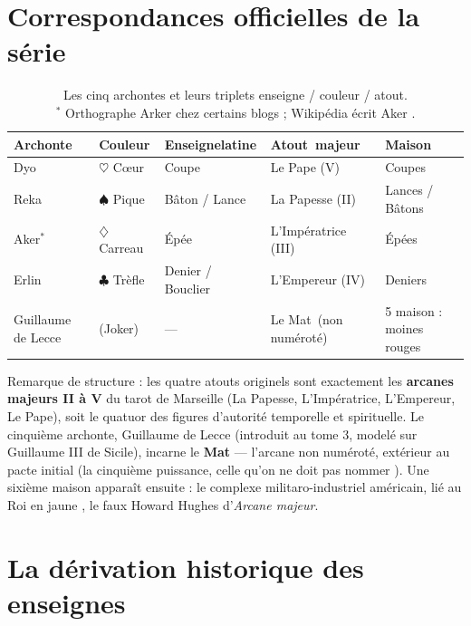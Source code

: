 \documentclass[11pt,a5paper]{article}
\newcommand{\carreau}{\ensuremath{\diamondsuit}}
\newcommand{\coeur}{\ensuremath{\heartsuit}}
\newcommand{\pique}{\ensuremath{\spadesuit}}
\newcommand{\trefle}{\ensuremath{\clubsuit}}
\begin{document}
\section{Correspondances officielles de la série}

\begin{table}[h]
\centering
\begin{tabular}{ p{} p{} p{} p{} p{}}
\toprule
\textbf{Archonte} 	& \textbf{Couleur} 		& \textbf{Enseigne\newline latine} & \textbf{Atout~\newline majeur} & \textbf{Maison} \\
\midrule
Dyo 				& \coeur{} Cœur 		& Coupe 				& Le Pape (V) 			& Coupes \\
Reka 				& \pique{} Pique 		& Bâton / Lance 		& La Papesse (II) 		& Lances / Bâtons \\
Aker$^{*}$ 			& \carreau{} Carreau 	& Épée 					& L'Impératrice (III) 	& Épées \\
Erlin 				& \trefle{} Trèfle 		& Denier / Bouclier 	& L'Empereur (IV) 		& Deniers \\
\midrule
Guillaume de Lecce 	& (Joker) 				& --- 					& Le Mat~\newline (non numéroté) 	& 5\ieme{} maison : moines rouges \\
\bottomrule
\end{tabular}
\caption{Les cinq archontes et leurs triplets enseigne / couleur / atout.\\
$^{*}$ Orthographe \og Arker \fg{} chez certains blogs ; Wikipédia écrit \og Aker \fg{}.}
\end{table}

Remarque de structure : les quatre atouts originels sont exactement les
\textbf{arcanes majeurs II à V} du tarot de Marseille (La Papesse,
L'Impératrice, L'Empereur, Le Pape), soit le quatuor des figures d'autorité
temporelle et spirituelle. Le cinquième archonte, Guillaume de Lecce
(introduit au tome 3, modelé sur Guillaume III de Sicile), incarne le
\textbf{Mat} --- l'arcane non numéroté, extérieur au pacte initial
(\og la cinquième puissance, celle qu'on ne doit pas nommer \fg{}).
Une \og sixième maison \fg{} apparaît ensuite : le complexe
militaro-industriel américain, lié au \og Roi en jaune \fg{}, le faux
Howard Hughes d'\emph{Arcane majeur}.

\section{La dérivation historique des enseignes}
\end{document}
